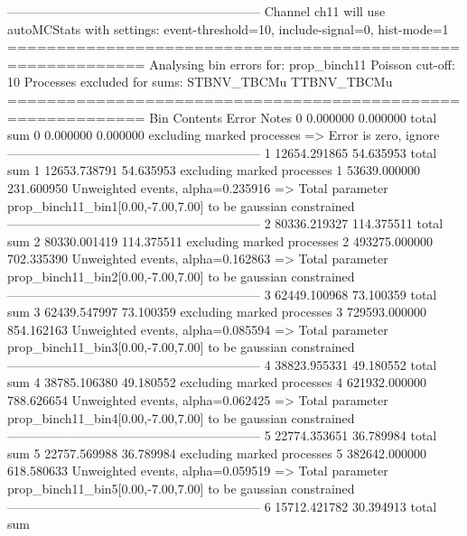 ------------------------------------------------------------
Channel ch11 will use autoMCStats with settings: event-threshold=10, include-signal=0, hist-mode=1
============================================================
Analysing bin errors for: prop_binch11
Poisson cut-off: 10
Processes excluded for sums: STBNV_TBCMu TTBNV_TBCMu
============================================================
Bin        Contents        Error           Notes                         
0          0.000000        0.000000        total sum                     
0          0.000000        0.000000        excluding marked processes    
  => Error is zero, ignore      
------------------------------------------------------------
1          12654.291865    54.635953       total sum                     
1          12653.738791    54.635953       excluding marked processes    
1          53639.000000    231.600950      Unweighted events, alpha=0.235916
  => Total parameter prop_binch11_bin1[0.00,-7.00,7.00] to be gaussian constrained
------------------------------------------------------------
2          80336.219327    114.375511      total sum                     
2          80330.001419    114.375511      excluding marked processes    
2          493275.000000   702.335390      Unweighted events, alpha=0.162863
  => Total parameter prop_binch11_bin2[0.00,-7.00,7.00] to be gaussian constrained
------------------------------------------------------------
3          62449.100968    73.100359       total sum                     
3          62439.547997    73.100359       excluding marked processes    
3          729593.000000   854.162163      Unweighted events, alpha=0.085594
  => Total parameter prop_binch11_bin3[0.00,-7.00,7.00] to be gaussian constrained
------------------------------------------------------------
4          38823.955331    49.180552       total sum                     
4          38785.106380    49.180552       excluding marked processes    
4          621932.000000   788.626654      Unweighted events, alpha=0.062425
  => Total parameter prop_binch11_bin4[0.00,-7.00,7.00] to be gaussian constrained
------------------------------------------------------------
5          22774.353651    36.789984       total sum                     
5          22757.569988    36.789984       excluding marked processes    
5          382642.000000   618.580633      Unweighted events, alpha=0.059519
  => Total parameter prop_binch11_bin5[0.00,-7.00,7.00] to be gaussian constrained
------------------------------------------------------------
6          15712.421782    30.394913       total sum                     
